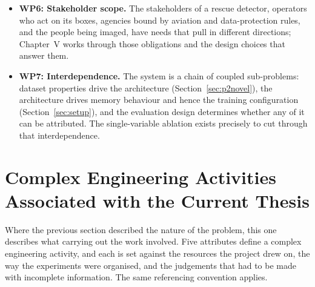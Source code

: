 \begin{itemize}
        (Sections~\ref{sec:metrics} and~\ref{sec:protocol}) had to be designed for the problem.
  \item \textbf{WP6: Stakeholder scope.} The stakeholders of a rescue
        detector, operators who act on its boxes, agencies bound by aviation
        and data-protection rules, and the people being imaged, have needs
        that pull in different directions; Chapter~V works through those
        obligations and the design choices that answer them.
  \item \textbf{WP7: Interdependence.} The system is a chain of coupled
        sub-problems: dataset properties drive the architecture
        (Section~\ref{sec:p2novel}), the architecture drives memory behaviour and hence
        the training configuration (Section~\ref{sec:setup}), and the evaluation design
        determines whether any of it can be attributed. The single-variable
        ablation exists precisely to cut through that interdependence.
\end{itemize}

\section{Complex Engineering Activities Associated with the Current Thesis}

Where the previous section described the nature of the problem, this one
describes what carrying out the work involved. Five attributes define a complex
engineering activity, and each is set against the resources the project drew on,
the way the experiments were organised, and the judgements that had to be made
with incomplete information. The same referencing convention applies.


